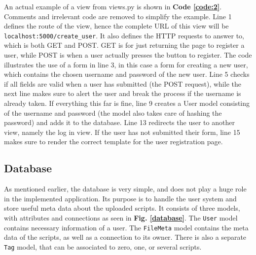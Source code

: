 \noindent An actual example of a view from views.py is shown in \textbf{Code \ref{code:2}}. Comments and irrelevant code are removed to simplify the example. Line 1 defines the route of the view, hence the complete URL of this view will be \texttt{localhost:5000/create\_user}. It also defines the HTTP requests to answer to, which is both GET and POST. GET is for just returning the page to register a user, while POST is when a user actually presses the button to register. The code illustrates the use of a form in line 3, in this case a form for creating a new user, which contains the chosen username and password of the new user. Line 5 checks if all fields are valid when a user has submitted (the POST request), while the next line makes sure to alert the user and break the process if the username is already taken. If everything this far is fine, line 9 creates a User model consisting of the username and password (the model also takes care of hashing the password) and adds it to the database. Line 13 redirects the user to another view, namely the log in view. If the user has not submitted their form, line 15 makes sure to render the correct template for the user registration page. \\


\subsection{Database}

As mentioned earlier, the database is very simple, and does not play a huge role in the implemented application. Its purpose is to handle the user system and store useful meta data about the uploaded scripts. It consists of three models, with attributes and connections as seen in \textbf{Fig. \ref{database}}. The \texttt{User} model contains necessary information of a user. The \texttt{FileMeta} model contains the meta data of the scripts, as well as a connection to its owner. There is also a separate \texttt{Tag} model, that can be associated to zero, one, or several scripts.

